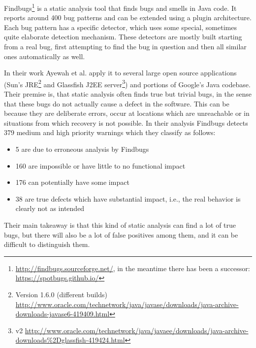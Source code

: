 Findbugs\footnote{\url{http://findbugs.sourceforge.net/}, in the meantime there has been a successor: \url{https://spotbugs.github.io/}} is a static analysis tool that finds bugs and smells in Java code.
It reports around 400 bug patterns and can be extended using a plugin architecture.
Each bug pattern has a specific detector, which uses some special, sometimes quite elaborate detection mechanism.
These detectors are mostly built starting from a real bug, first attempting to find the bug in question and then all similar ones automatically as well.

In their work Ayewah et al. \cite{ayewah2007evaluating} apply it to several large open source applications
(Sun's JRE\footnote{Version 1.6.0 (different builds) \url{http://www.oracle.com/technetwork/java/javase/downloads/java-archive-downloads-javase6-419409.html}}
and Glassfish J2EE server\footnote{v2 \url{http://www.oracle.com/technetwork/java/javaee/downloads/java-archive-downloads\%2Dglassfish-419424.html}})
and portions of Google's Java codebase.
Their premise is, that static analysis often finds true but trivial bugs, in the sense that these bugs do not actually cause a defect in the software.
This can be because they are deliberate errors, occur at locations which are unreachable or in situations from which recovery is not possible.
In their analysis Findbugs detects 379 medium and high priority warnings which they classify as follows:
\begin{itemize}
    \item 5 are due to erroneous analysis by Findbugs
    \item 160 are impossible or have little to no functional impact
    \item 176 can potentially have some impact
    \item 38 are true defects which have substantial impact, i.e., the real behavior is clearly not as intended
\end{itemize}
Their main takeaway is that this kind of static analysis can find a lot of true bugs, but there will also be a lot of false positives among them, and it can be difficult to distinguish them.

